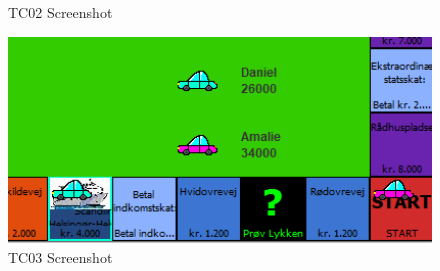 \begin{flushleft}
\begin{figure}[H]
    \caption{TC02 Screenshot}
    \label{TC02Bilag}
\end{figure}\begin{figure}[H] %
    \centering
    \includegraphics[width=16cm]{Report/figures/Usertests/BilagTC03.png}
    \caption{TC03 Screenshot}
    \label{TC03Bilag}
\end{figure}

\end{flushleft}
